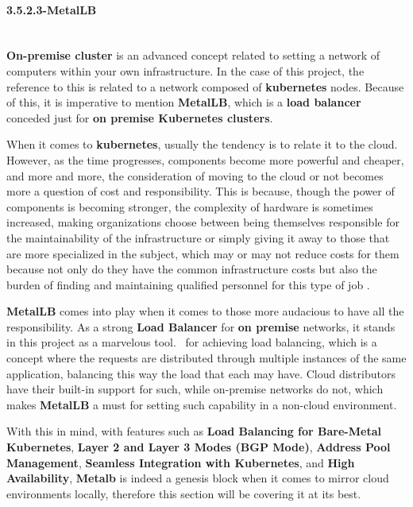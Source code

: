 \paragraph{3.5.2.3-MetalLB}\mbox{}\\
\textbf{On-premise cluster} is an advanced concept related to setting a network of computers within your own infrastructure. In the case of this project, the reference to this is related to a network composed of \textbf{kubernetes} nodes. Because of this, it is imperative to mention \textbf{MetalLB}, which is a \textbf{load balancer} conceded just for \textbf{on premise Kubernetes clusters}.

When it comes to \textbf{kubernetes}, usually the tendency is to relate it to the cloud. However, as the time progresses, components become more powerful and cheaper, and more and more, the consideration of moving to the cloud or not becomes more a question of cost and responsibility. This is because, though the power of components is becoming stronger, the complexity of hardware is sometimes increased, making organizations choose between being themselves responsible for the maintainability of the infrastructure or simply giving it away to those that are more specialized in the subject, which may or may not reduce costs for them because not only do they have the common infrastructure costs but also the burden of finding and maintaining qualified personnel for this type of job \cite{onpremice-cloud}.

\textbf{MetalLB} comes into play when it comes to those more audacious to have all the responsibility. As a strong \textbf{Load Balancer} for \textbf{on premise} networks, it stands in this project as a marvelous tool. 
for achieving load balancing, which is a concept where the requests are distributed through multiple instances of the same application, balancing this way the load that each may have. Cloud distributors have their built-in support for such, while on-premise networks do not, which makes \textbf{MetalLB} a must for setting such capability in a non-cloud environment.

With this in mind, with features such as \textbf{Load Balancing for Bare-Metal Kubernetes}, \textbf{Layer 2 and Layer 3 Modes (BGP Mode)}, \textbf{Address Pool Management}, \textbf{Seamless Integration with Kubernetes}, and \textbf{High Availability}, \textbf{Metalb} is indeed a genesis block when it comes to mirror cloud environments locally, therefore this section will be covering it at its best.

